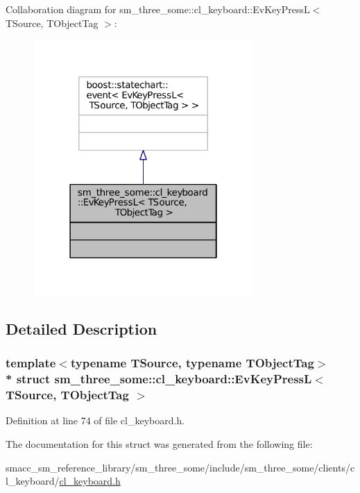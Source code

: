 Collaboration diagram for sm\+\_\+three\+\_\+some\+:\+:cl\+\_\+keyboard\+:\+:Ev\+Key\+PressL$<$ T\+Source, T\+Object\+Tag $>$\+:
\nopagebreak
\begin{figure}[H]
\begin{center}
\leavevmode
\includegraphics[width=238pt]{structsm__three__some_1_1cl__keyboard_1_1EvKeyPressL__coll__graph}
\end{center}
\end{figure}


\subsection{Detailed Description}
\subsubsection*{template$<$typename T\+Source, typename T\+Object\+Tag$>$\\*
struct sm\+\_\+three\+\_\+some\+::cl\+\_\+keyboard\+::\+Ev\+Key\+Press\+L$<$ T\+Source, T\+Object\+Tag $>$}



Definition at line 74 of file cl\+\_\+keyboard.\+h.



The documentation for this struct was generated from the following file\+:\begin{DoxyCompactItemize}
\item 
smacc\+\_\+sm\+\_\+reference\+\_\+library/sm\+\_\+three\+\_\+some/include/sm\+\_\+three\+\_\+some/clients/cl\+\_\+keyboard/\hyperlink{cl__keyboard_8h}{cl\+\_\+keyboard.\+h}\end{DoxyCompactItemize}
